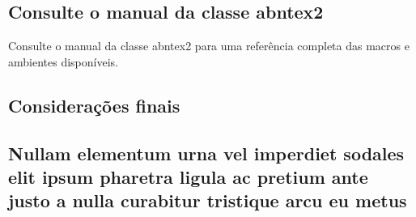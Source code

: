 \documentclass[
article,			%
11pt,				%
twoside,			%
a4paper,			%
twocolumn,          %
english,			%
brazil,				%
sumario=tradicional
]{abntex2}
\begin{document}
    \section{Consulte o manual da classe \textsf{abntex2}}
    
    Consulte o manual da classe \textsf{abntex2} \cite{abntex2classe} para uma referência completa das macros e ambientes disponíveis.
    
    \lipsum[5]
    
    \lipsum[4]
    
    \lipsum[7]
    
    \lipsum[3]
    
    
    \section*{Considerações finais}
    
    \lipsum[1]
    
    \begin{citacao}
        \lipsum[2]
    \end{citacao}
    
    \lipsum[3]
    
    \postextual                 %
    
    
    
    
    \vspace{1cm}
    \begin{apendicesenv}
        
        \chapter{Nullam elementum urna vel imperdiet sodales elit ipsum pharetra ligula
            ac pretium ante justo a nulla curabitur tristique arcu eu metus}
        \lipsum[55-57]
        
    \end{apendicesenv}
    
\end{document}
